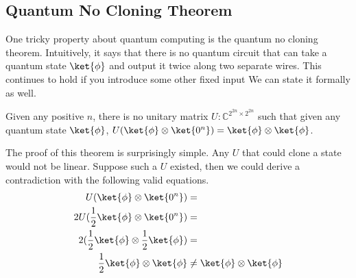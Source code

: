 \subsection{Quantum No Cloning Theorem}
One tricky property about quantum computing is the quantum no cloning theorem.
Intuitively, it says that there is no quantum circuit that can take a quantum state $\ket{\phi}$ and output it twice along two separate wires.
This continues to hold if you introduce some other fixed input
We can state it formally as well.
\begin{theorem}
Given any positive $n$, there is no unitary matrix $U:\mathbb{C}^{2^{2n}\times 2^{2n}}$ such that given any quantum state $\ket{\phi}$,
$U(\ket{\phi}\otimes\ket{0^n}) = \ket{\phi} \otimes \ket{\phi}$.
\end{theorem}
The proof of this theorem is surprisingly simple.
Any $U$ that could clone a state would not be linear.
Suppose such a $U$ existed, then we could derive a contradiction with the following valid equations.
\begin{align*}
U(\ket{\phi}\otimes\ket{0^n}) &=\\
2U(\frac{1}{2}\ket{\phi} \otimes \ket{0^n}) &=\\
2(\frac{1}{2}\ket{\phi} \otimes \frac{1}{2}\ket{\phi}) &=\\
\frac{1}{2} \ket{\phi} \otimes \ket{\phi} &\neq \ket{\phi} \otimes \ket{\phi}
\end{align*}


